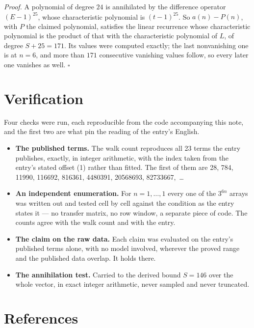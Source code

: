 \documentclass[11pt]{article}
\theoremstyle{definition}
\begin{document}
{\itshape Proof.} A polynomial of degree $24$ is annihilated by the difference operator $(E-1)^{25}$, whose characteristic polynomial is $(t-1)^{25}$. So $a(n) - P(n)$, with $P$ the claimed polynomial, satisfies the linear recurrence whose characteristic polynomial is the product of that with the characteristic polynomial of $L$, of degree $S + 25 = 171$. Its values were computed exactly; the last nonvanishing one is at $n = 6$, and more than $171$ consecutive vanishing values follow, so every later one vanishes as well. $\square$

\section{Verification}

Four checks were run, each reproducible from the code accompanying this note, and the first two are what pin the reading of the entry's English.

\begin{itemize}

\item {\bfseries The published terms.} The walk count reproduces all 23 terms the entry publishes, exactly, in integer arithmetic, with the index taken from the entry's stated offset (1) rather than fitted. The first of them are 28, 784, 11990, 116692, 816361, 4480391, 20568693, 82733667,~\dots

\item {\bfseries An independent enumeration.} For $n = 1,\dots,1$ every one of the $3^{6n}$ arrays was written out and tested cell by cell against the condition as the entry states it --- no transfer matrix, no row window, a separate piece of code. The counts agree with the walk count and with the entry.

\item {\bfseries The claim on the raw data.} Each claim was evaluated on the entry's published terms alone, with no model involved, wherever the proved range and the published data overlap. It holds there.

\item {\bfseries The annihilation test.} Carried to the derived bound $S = 146$ over the whole vector, in exact integer arithmetic, never sampled and never truncated.

\end{itemize}

\section{References}
\end{document}
